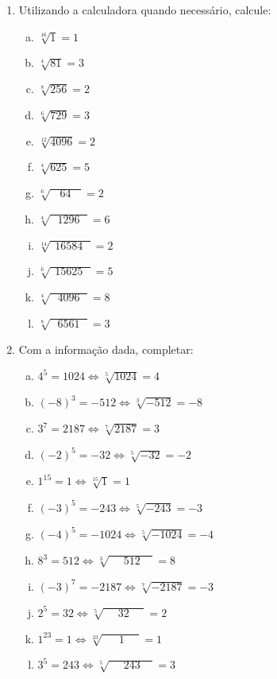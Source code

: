 \documentclass[a4paper,14pt]{article}
\begin{document}
\begin{multicols}{2}
\begin{enumerate}
        \item Utilizando a calculadora quando necessário, calcule:
		\begin{enumerate}[a)]
        	\item $\sqrt[16]{1} = 1$
        	\item $\sqrt[4]{81} = 3$
        	\item $\sqrt[8]{256} = 2$
        	\item $\sqrt[6]{729} = 3$
        	\item $\sqrt[12]{4096} = 2$
        	\item $\sqrt[4]{625} = 5$
        	\item $\sqrt[6]{~~~~64~~~~} = 2$
        	\item $\sqrt[4]{~~~1296~~~} = 6$
        	\item $\sqrt[14]{~~16584~~~} = 2$
        	\item $\sqrt[6]{~~15625~~~} = 5$
        	\item $\sqrt[4]{~~~4096~~~} = 8$
        	\item $\sqrt[8]{~~~6561~~~} = 3$
        \end{enumerate}
        \item Com a informação dada, completar:
        \begin{enumerate}[a)]
        	\item $4^5 = 1024 \Leftrightarrow \sqrt[5]{1024} = 4$
        	\item $(-8)^3 = -512 \Leftrightarrow \sqrt[3]{-512} = -8$
        	\item $3^7 = 2187 \Leftrightarrow \sqrt[7]{2187} = 3$
        	\item $(-2)^5 = -32 \Leftrightarrow \sqrt[5]{-32} = -2$
        	\item $1^{15} = 1 \Leftrightarrow \sqrt[15]{1} = 1$
        	\item $(-3)^5 = -243 \Leftrightarrow \sqrt[5]{-243} = -3$
        	\item $(-4)^5 = -1024 \Leftrightarrow \sqrt[5]{-1024} = -4$
        	\item $8^3 = 512 \Leftrightarrow \sqrt[3]{~~~~~~512~~~~~} = 8 $
        	\item $(-3)^7 = -2187 \Leftrightarrow \sqrt[7]{-2187} = -3$
        	\item $2^5 = 32 \Leftrightarrow \sqrt[5]{~~~~~~32~~~~~~} = 2$
        	\item $1^{23} = 1 \Leftrightarrow \sqrt[23]{~~~~~~~1~~~~~~} = 1$
        	\item $3^5 = 243 \Leftrightarrow \sqrt[5]{~~~~~~243~~~~~} = 3$

\end{enumerate}
\end{enumerate}
\end{multicols}
\end{document}
